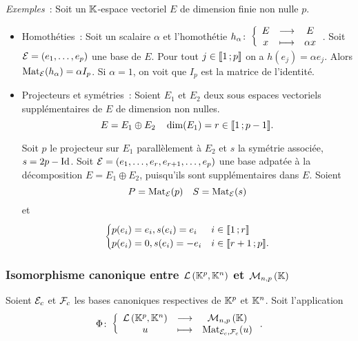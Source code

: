 \emph{Exemples}~: Soit un \(\mathbb{K}\)-espace vectoriel \(E\) de dimension finie non 
nulle \(p\).
\begin{itemize}
  \item Homothéties~: Soit un scalaire \(\alpha\) et l'homothétie 
    \(h_\alpha\colon \left\{\begin{array}{ccc} E & \longrightarrow &E\\ x & \longmapsto & \alpha x \end{array} \right.\). Soit \(\mathcal{E}=(e_1,\ldots, e_p)\) 
    une base de \(E\). Pour tout \(j \in \mathopen{\llbracket}1\mathclose{}\mathpunct{};p\mathclose{\rrbracket}\) on a 
    \(h(e_j)=\alpha e_j\). Alors \(\mathrm{Mat}_{\mathcal{E}}(h_\alpha)=\alpha I_p\). Si 
    \(\alpha=1\), on voit que \(I_p\) est la matrice de l'identité.
  \item Projecteurs et symétries~: Soient \(E_1\) et \(E_2\) deux sous espaces 
    vectoriels supplémentaires de \(E\) de dimension non nulles.
    \begin{equation}
      E=E_1 \oplus E_2 \quad \dim(E_1)=r \in \mathopen{\llbracket}1\mathclose{}\mathpunct{};p-1\mathclose{\rrbracket}.
    \end{equation}

    Soit \(p\) le projecteur sur \(E_1\) parallèlement à \(E_2\) et \(s\) la 
    symétrie associée, \(s=2p -\operatorname{Id}\). Soit \(\mathcal{E}=(e_1, \ldots, e_r, e_{r+1}, 
    \ldots, e_p)\) une base adpatée à la décomposition \(E=E_1 \oplus E_2\), 
    puisqu'ils sont supplémentaires dans \(E\). Soient
    \begin{equation}
      P=\mathrm{Mat}_{\mathcal{E}}(p) \quad S=\mathrm{Mat}_{\mathcal{E}}(s)
    \end{equation}
    et
    \begin{equation}
      \begin{cases}
        p(e_i)=e_i, s(e_i)=e_i & i \in \mathopen{\llbracket}1\mathclose{}\mathpunct{};r\mathclose{\rrbracket} \\
        p(e_i)=0, s(e_i)=-e_i & i \in \mathopen{\llbracket}r+1\mathclose{}\mathpunct{};p\mathclose{\rrbracket}.
      \end{cases}
    \end{equation}
\end{itemize}

\subsubsection{Isomorphisme canonique entre \(\mathcal{L}\left(\mathbb{K}^p,\mathbb{K}^n\right)\) et 
\(\mathcal{M}_{n,p}\left(\mathbb{K}\right)\)}


Soient \(\mathcal{E}_c\) et \(\mathcal{F}_c\) les bases canoniques respectives de \(\mathbb{K}^p\) et 
\(\mathbb{K}^n\). Soit l'application 
\[\Phi\colon \left\{\begin{array}{ccc} \mathcal{L}\left(\mathbb{K}^p,\mathbb{K}^n\right) & \longrightarrow &\mathcal{M}_{n,p}\left(\mathbb{K}\right)\\ u & \longmapsto & \mathrm{Mat}_{\mathcal{E}_c,\mathcal{F}_c}(u) \end{array} \right..\]

